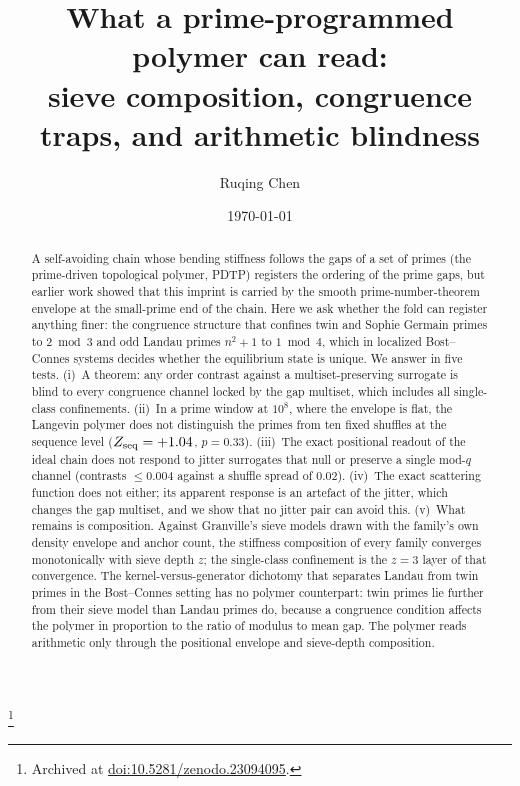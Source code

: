 \documentclass[reprint,amsmath,amssymb,aps,pre,longbibliography]{revtex4-2}
\begin{document}
\title{What a prime-programmed polymer can read:\\
sieve composition, congruence traps, and arithmetic blindness}

\author{Ruqing Chen}
\thanks{Archived at \href{https://doi.org/10.5281/zenodo.23094095}{doi:10.5281/zenodo.23094095}.}
\date{\today}

\begin{abstract}
A self-avoiding chain whose bending stiffness follows the gaps of a set of primes (the
prime-driven topological polymer, PDTP) registers the ordering of the prime gaps, but earlier
work showed that this imprint is carried by the smooth prime-number-theorem envelope at the
small-prime end of the chain. Here we ask whether the fold can register anything finer: the
congruence structure that confines twin and Sophie Germain primes to $2\bmod3$ and odd Landau
primes $n^2+1$ to $1\bmod4$, which in localized Bost--Connes systems decides whether the
equilibrium state is unique. We answer in five tests. (i)~A theorem: any order contrast against a
multiset-preserving surrogate is blind to every congruence channel locked by the gap multiset,
which includes all single-class confinements. (ii)~In a prime window at $10^8$, where the
envelope is flat, the Langevin polymer does not distinguish the primes from ten fixed shuffles
at the sequence level ($Z_{\rm seq}=+1.04$, $p=0.33$). (iii)~The exact positional readout of the
ideal chain does not respond to jitter surrogates that null or preserve a single mod-$q$
channel (contrasts $\le0.004$ against a shuffle spread of $0.02$). (iv)~The exact scattering
function does not either; its apparent response is an artefact of the jitter, which changes the
gap multiset, and we show that no jitter pair can avoid this. (v)~What remains is composition.
Against Granville's sieve models drawn with the family's own density envelope and anchor count,
the stiffness composition of every family converges monotonically with sieve depth $z$; the
single-class confinement is the $z=3$ layer of that convergence. The kernel-versus-generator
dichotomy that separates Landau from twin primes in the Bost--Connes setting has no polymer
counterpart: twin primes lie further from their sieve model than Landau primes do, because a
congruence condition affects the polymer in proportion to the ratio of modulus to mean gap. The
polymer reads arithmetic only through the positional envelope and sieve-depth composition.
\end{abstract}
\end{document}
